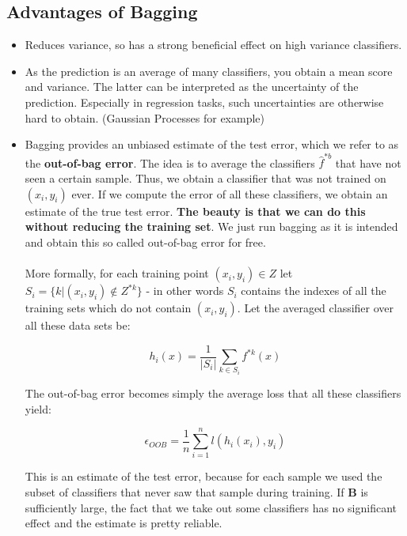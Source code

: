 \documentclass[twoside]{article}
\begin{document}
\subsection{Advantages of Bagging}
\begin{itemize}
    \item Reduces variance, so has a strong beneficial effect on high variance classifiers.
    \item As the prediction is an average of many classifiers, you obtain a mean score and variance. The latter can be interpreted as the uncertainty of the prediction. Especially in regression tasks, such uncertainties are otherwise hard to obtain. (Gaussian Processes for example)
    \item Bagging provides an unbiased estimate of the test error, which we refer to as the \textbf{out-of-bag error}. The idea is to  average the classifiers $\hat{f}^{*b}$  that have not seen a certain sample. Thus, we obtain a classifier that was not trained on $(x_{i},y_{i})$ ever. If we compute the error of all these classifiers, we obtain an estimate of the true test error. \textbf{The beauty is that we can do this without reducing the training set}. We just run bagging as it is intended and obtain this so called out-of-bag error for free. \\ \\
    More formally, for each training point $(x_{i},y_{i}) \in Z$ let $S_{i}=\{ k| (x_{i},y_{i}) \not \in Z^{*k}\}$ - in other words $S_{i}$ contains the indexes of all the training sets which do not contain $(x_{i},y_{i})$. Let the averaged classifier over all these data sets be:
    
    \begin{equation*}
        h_{i}(x) = \dfrac{1}{|S_{i}|} \sum_{k \in S_{i}} f^{*k}(x)
    \end{equation*}
    
    The out-of-bag error becomes simply the average loss that all these classifiers yield:
    
    \begin{equation*}
    \epsilon_{OOB} = \dfrac{1}{n} \sum_{i=1}^{n} l(h_{i}(x_{i}),y_{i})
    \end{equation*}

This is an estimate of the test error, because for each sample we used the subset of classifiers that never saw that sample during training. If $\mathbf{B}$ is sufficiently large, the fact that we take out some classifiers has no significant effect and the estimate is pretty reliable.
\end{itemize}
\end{document}
